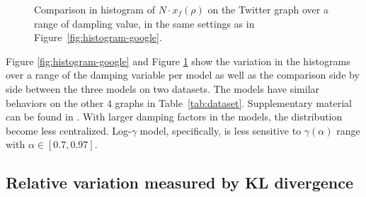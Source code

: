 \documentclass[conference]{IEEEtran}
\begin{document}
% 
% 

\begin{figure}[!htb]
  \centering

  \caption{\footnotesize 
  Comparison in histogram of $N\cdot x_f(\rho)$ on the Twitter graph 
  over a range of dampling value, in the same settings as in
  Figure~\ref{fig:histogram-google}.
  }
\label{fig:histogram-twitter}
\end{figure}


% 
%
Figure \ref{fig:histogram-google} and Figure \ref{fig:histogram-twitter} show the variation in the histograms over a range of the damping
variable per model as well as the comparison side by side between
the three models on two datasets. The models
have similar behaviors on the other $4$ graphs in Table~\ref{tab:dataset}.
Supplementary material can be found in \cite{MS-qian-2018}. With larger damping factors in the models, 
the distribution become less centralized. Log-$\gamma$ model, specifically, is less sensitive to $\gamma(\alpha)$
range with $\alpha \in [0.7,0.97]$.
% 


%



\subsection{Relative variation measured by  KL divergence} 
\label{subsec:intro-model-analysis}
%
\end{document}
